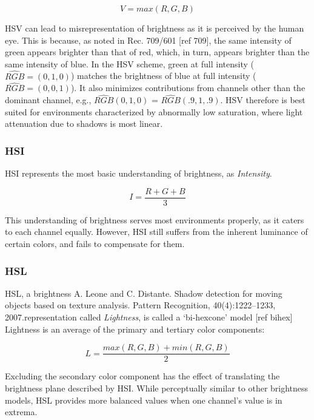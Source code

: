 \documentclass[12pt]{report}
\begin{document}
\begin{equation}
V = max(R, G, B)
\label{eqn:hsv}
\end{equation}

HSV can lead to misrepresentation of brightness as it is perceived by the human eye. This is because, as noted in Rec. 709/601 [ref 709], the same intensity of green appears brighter than that of red, which, in turn, appears brighter than the same intensity of blue. In the HSV scheme, green at full intensity ($\hat{RGB} = (0, 1, 0)$) matches the brightness of blue at full intensity ($\hat{RGB} = (0, 0, 1)$). It also minimizes contributions from channels other than the dominant channel, e.g., $\hat{RGB}(0, 1, 0)$ = $\hat{RGB}(.9, 1, .9)$. HSV therefore is best suited for environments characterized by abnormally low saturation, where light attenuation due to shadows is most linear.

\subsubsection{HSI}

HSI represents the most basic understanding of brightness, as \textit{Intensity}. 

\begin{equation}
I = \dfrac{R + G + B}{3}
\end{equation}

This understanding of brightness serves most environments properly, as it caters to each channel equally. However, HSI still suffers from the inherent luminance of certain colors, and fails to compensate for them.

\subsubsection{HSL}

HSL, a brightness A. Leone and C. Distante. Shadow detection for moving objects based on texture analysis. Pattern Recognition, 40(4):1222–1233,
2007.representation called \textit{Lightness}, is called a `bi-hexcone' model [ref bihex] Lightness is an average of the primary and tertiary color components:

\begin{equation}
L = \dfrac{max(R,G,B) + min(R,G,B)}{2}
\end{equation}

Excluding the secondary color component has the effect of translating the brightness plane described by HSI. While perceptually similar to other brightness models, HSL provides more balanced values when one channel's value is in extrema.
\end{document}
